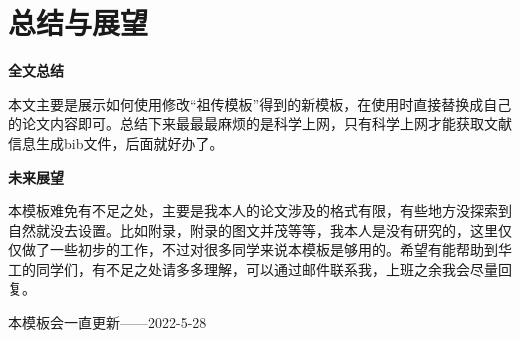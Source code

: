 \chapter{总结与展望}

{\large \textbf{全文总结}}


本文主要是展示如何使用修改“祖传模板”得到的新模板，在使用时直接替换成自己的论文内容即可。总结下来最最最麻烦的是科学上网，只有科学上网才能获取文献信息生成bib文件，后面就好办了。


{\large \textbf{未来展望}}

本模板难免有不足之处，主要是我本人的论文涉及的格式有限，有些地方没探索到自然就没去设置。比如附录，附录的图文并茂等等，我本人是没有研究的，这里仅仅做了一些初步的工作，不过对很多同学来说本模板是够用的。希望有能帮助到华工的同学们，有不足之处请多多理解，可以通过邮件联系我，上班之余我会尽量回复。

本模板会一直更新——2022-5-28